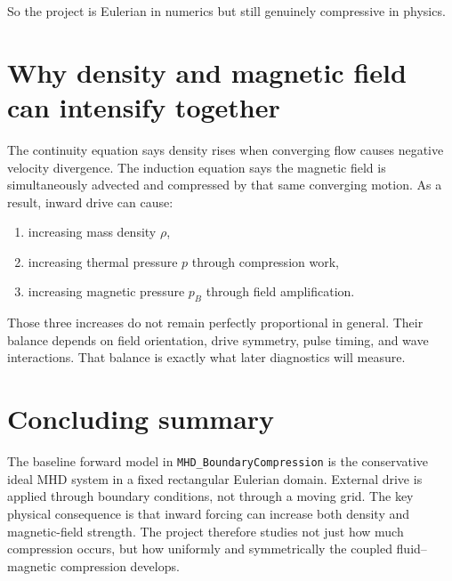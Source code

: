 \documentclass[11pt]{article}
\begin{document}
So the project is Eulerian in numerics but still genuinely compressive in physics.

\section{Why density and magnetic field can intensify together}
The continuity equation says density rises when converging flow causes negative velocity divergence. The induction equation says the magnetic field is simultaneously advected and compressed by that same converging motion. As a result, inward drive can cause:
\begin{enumerate}
    \item increasing mass density $\rho$,
    \item increasing thermal pressure $p$ through compression work,
    \item increasing magnetic pressure $p_B$ through field amplification.
\end{enumerate}

Those three increases do not remain perfectly proportional in general. Their balance depends on field orientation, drive symmetry, pulse timing, and wave interactions. That balance is exactly what later diagnostics will measure.

\section{Concluding summary}
The baseline forward model in \texttt{MHD\_BoundaryCompression} is the conservative ideal MHD system in a fixed rectangular Eulerian domain. External drive is applied through boundary conditions, not through a moving grid. The key physical consequence is that inward forcing can increase both density and magnetic-field strength. The project therefore studies not just how much compression occurs, but how uniformly and symmetrically the coupled fluid--magnetic compression develops.
\end{document}
